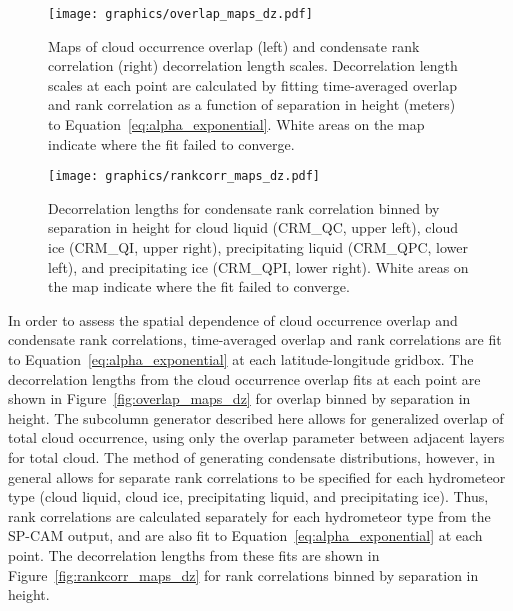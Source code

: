 \begin{figure}[tp]
\centering
\texttt{[image: graphics/overlap\_maps\_dz.pdf]}
\caption{\label{fig:overlap_maps_dz}Maps of cloud occurrence overlap
(left) and condensate rank correlation (right) decorrelation length
scales. Decorrelation length scales at each point are calculated by
fitting time-averaged overlap and rank correlation as a function of
separation in height (meters) to Equation~\ref{eq:alpha_exponential}.
White areas on the map indicate where the fit failed to
converge.}\label{fig:overlapux5fmapsux5fdz}
\end{figure}

\begin{figure}[tp]
\centering
\texttt{[image: graphics/rankcorr\_maps\_dz.pdf]}
\caption{\label{fig:rankcorr_maps_dz}Decorrelation lengths for
condensate rank correlation binned by separation in height for cloud
liquid (CRM\_QC, upper left), cloud ice (CRM\_QI, upper right),
precipitating liquid (CRM\_QPC, lower left), and precipitating ice
(CRM\_QPI, lower right). White areas on the map indicate where the fit
failed to converge.}\label{fig:rankcorrux5fmapsux5fdz}
\end{figure}

In order to assess the spatial dependence of cloud occurrence overlap
and condensate rank correlations, time-averaged overlap and rank
correlations are fit to Equation~\ref{eq:alpha_exponential} at each
latitude-longitude gridbox. The decorrelation lengths from the cloud
occurrence overlap fits at each point are shown in
Figure~\ref{fig:overlap_maps_dz} for overlap binned by separation in
height. The subcolumn generator described here allows for generalized
overlap of total cloud occurrence, using only the overlap parameter
between adjacent layers for total cloud. The method of generating
condensate distributions, however, in general allows for separate rank
correlations to be specified for each hydrometeor type (cloud liquid,
cloud ice, precipitating liquid, and precipitating ice). Thus, rank
correlations are calculated separately for each hydrometeor type from
the SP-CAM output, and are also fit to
Equation~\ref{eq:alpha_exponential} at each point. The decorrelation
lengths from these fits are shown in Figure~\ref{fig:rankcorr_maps_dz}
for rank correlations binned by separation in height.

